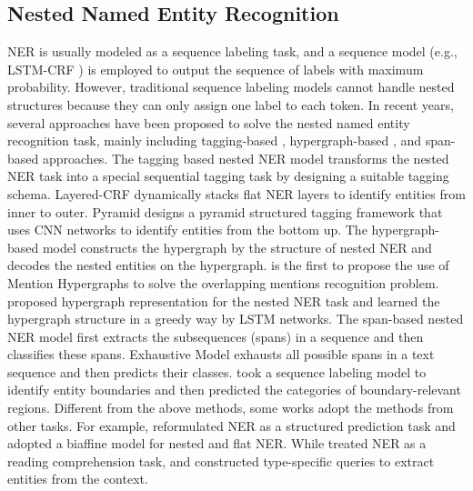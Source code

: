 \documentclass[11pt,a4paper]{article}
\begin{document}
\subsection{Nested Named Entity Recognition}
NER is usually modeled as a sequence labeling task, and a sequence model (e.g., LSTM-CRF \citep{huang2015bidirectional}) is employed to output the sequence of labels with maximum probability. However, traditional sequence labeling models cannot handle nested structures because they can only assign one label to each token. In recent years, several approaches have been proposed to solve the nested named entity recognition task, mainly including tagging-based \citep{alex-etal-2007-recognising, wang-etal-2020-pyramid}, hypergraph-based \citep{muis-lu-2017-labeling, katiyar-cardie-2018-nested}, and span-based \citep{sohrab-miwa-2018-deep, zheng-etal-2019-boundary} approaches. The tagging based nested NER model transforms the nested NER task into a special sequential tagging task by designing a suitable tagging schema. Layered-CRF \citep{alex-etal-2007-recognising} dynamically stacks flat NER layers to identify entities from inner to outer. Pyramid \citep{wang-etal-2020-pyramid} designs a pyramid structured tagging framework that uses CNN networks to identify entities from the bottom up. The hypergraph-based model constructs the hypergraph by the structure of nested NER and decodes the nested entities on the hypergraph. \citet{lu-roth-2015-joint} is the first to propose the use of Mention Hypergraphs to solve the overlapping mentions recognition problem.
\citet{katiyar-cardie-2018-nested} proposed hypergraph representation for the nested NER task and learned the hypergraph structure in a greedy way by LSTM networks.
The span-based nested NER model first extracts the subsequences (spans) in a sequence and then classifies these spans. Exhaustive Model \citep{sohrab-miwa-2018-deep} exhausts all possible spans in a text sequence and then predicts their classes. \citet{zheng-etal-2019-boundary, Tan_Qiu_Chen_Wang_Huang_2020} took a sequence labeling model to identify entity boundaries and then predicted the categories of boundary-relevant regions. 
Different from the above methods,
some works adopt the methods from other tasks. For example, \citet{yu-etal-2020-named} 
reformulated NER as a structured prediction task and adopted a biaffine model for nested and flat NER. While \citet{li-etal-2020-unified} treated NER as a reading comprehension task, and constructed type-specific queries to extract entities from the context.
\end{document}
